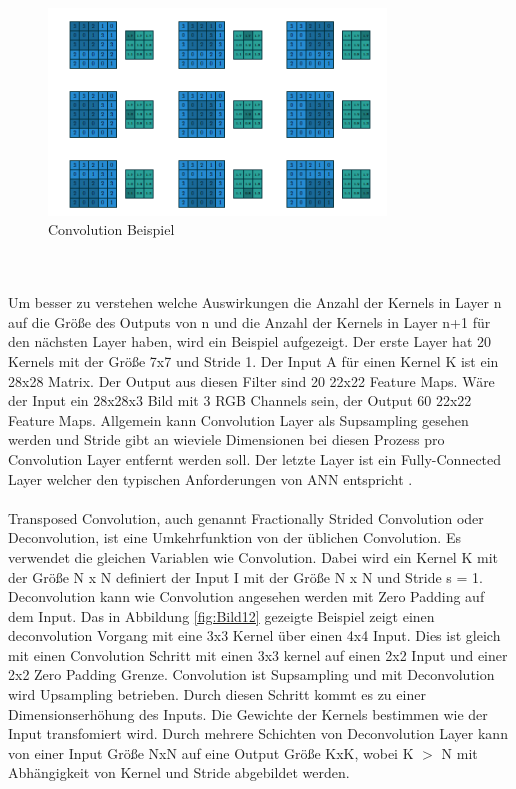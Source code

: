 \documentclass{llncs}
\begin{document}
\begin{figure}
	\centering
	\includegraphics[width=0.8\textwidth]{conv.png}
	\caption{Convolution Beispiel\protect\cite{conv}}
	\label{fig:Bild11}
\end{figure}
~\\\\
Um  besser zu verstehen welche Auswirkungen die Anzahl der Kernels in Layer n auf die Größe des Outputs von n und die Anzahl der Kernels in Layer n+1 für den nächsten Layer haben, wird ein Beispiel aufgezeigt. Der erste Layer hat 20 Kernels mit der Größe 7x7 und Stride 1. Der Input A für einen Kernel K ist ein 28x28 Matrix. Der Output aus diesen Filter sind 20 22x22 Feature Maps. Wäre der Input ein 28x28x3 Bild mit 3 RGB Channels sein, der Output 60 22x22 Feature Maps. Allgemein kann Convolution Layer als Supsampling gesehen werden und Stride gibt an wieviele Dimensionen bei diesen Prozess pro Convolution Layer entfernt werden soll. Der letzte Layer ist ein Fully-Connected Layer welcher den typischen Anforderungen von ANN entspricht \cite{conv}.  
\\\\
Transposed Convolution, auch genannt Fractionally Strided Convolution oder Deconvolution, ist eine Umkehrfunktion von der üblichen Convolution. Es verwendet die gleichen Variablen wie Convolution. Dabei wird ein Kernel K mit der Größe N x N definiert der Input I mit der Größe N x N und Stride s = 1. Deconvolution kann wie Convolution angesehen werden mit  Zero Padding auf dem Input.  Das in Abbildung \ref{fig:Bild12} gezeigte Beispiel zeigt einen deconvolution Vorgang mit eine 3x3 Kernel über einen 4x4 Input. Dies ist gleich mit einen Convolution Schritt mit einen 3x3 kernel auf einen 2x2 Input und einer 2x2 Zero Padding Grenze. Convolution ist Supsampling und mit Deconvolution wird Upsampling betrieben. Durch diesen Schritt kommt es zu einer Dimensionserhöhung des Inputs. Die Gewichte der Kernels bestimmen wie der Input transfomiert wird. Durch mehrere Schichten von Deconvolution Layer kann von einer Input Größe NxN auf eine Output Größe KxK, wobei K $>$ N mit Abhängigkeit von Kernel und Stride abgebildet werden\cite{conv}. 
\end{document}
